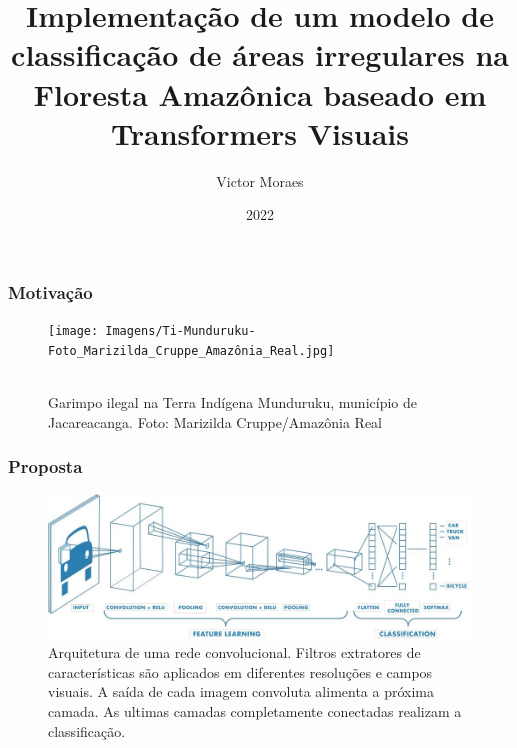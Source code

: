 \documentclass{beamer}
\title{Implementação de um modelo de classificação de áreas irregulares na Floresta Amazônica baseado em Transformers Visuais}
\author{Victor Moraes}
\institute{UFMG}
\date{2022}
\begin{document}
\frame{\titlepage}

\begin{frame}
\frametitle{Motivação}

    \begin{figure}[!h]
    \centering
    \texttt{[image: Imagens/Ti-Munduruku-Foto\_Marizilda\_Cruppe\_Amazônia\_Real.jpg]}
    \caption[width=0.2\columnwidth]{\\\small Garimpo ilegal na Terra Indígena Munduruku, município de Jacareacanga. Foto: Marizilda Cruppe/Amazônia Real}
    \label{fig:garimpo}
    \end{figure}


\end{frame}

\begin{frame}
\frametitle{Proposta}
    \begin{figure}[!ht]
        \centering
        \includegraphics[width=0.95\columnwidth]{
            Imagens/CNN_mathworks.jpg
        }
        \caption{Arquitetura de uma rede convolucional. Filtros extratores de características são aplicados em diferentes resoluções e campos visuais. A saída de cada imagem convoluta alimenta a próxima camada. As ultimas camadas completamente conectadas realizam a classificação.}
        \label{fig:cnn}
    \end{figure}
\end{frame}
\end{document}
